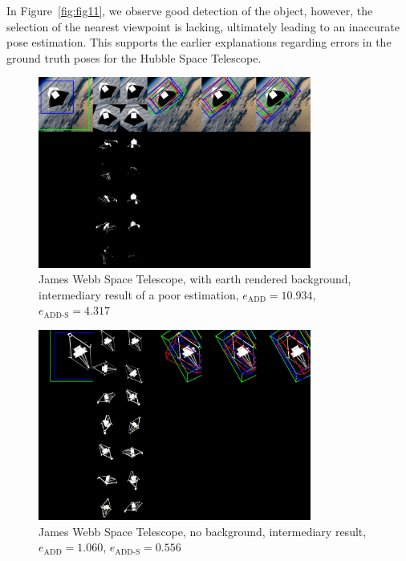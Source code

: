 \bigskip

In Figure~\ref{fig:fig11}, we observe good detection of the object, however, the selection of the nearest viewpoint is lacking, ultimately leading to an inaccurate pose estimation. This supports the earlier explanations regarding errors in the ground truth poses for the Hubble Space Telescope. 

\bigskip
\cleardoublepage{}

\begin{figure}[ht]
  \centering
  \includegraphics[width=0.8\textwidth]{data/fig12.jpg}
  \caption{James Webb Space Telescope, with earth rendered background, intermediary result of a poor estimation, $e_\mathrm{ADD}=10.934$, $e_{\mathrm{ADD}\text{-}\mathrm{S}}=4.317$}
  \label{fig:fig12}
\end{figure}

\bigskip

\begin{figure}[ht]
  \centering
  \includegraphics[width=0.8\textwidth]{data/fig16.jpg}
  \caption{James Webb Space Telescope, no background, intermediary result, $e_\mathrm{ADD}=1.060$, $e_{\mathrm{ADD}\text{-}\mathrm{S}}=0.556$}
  \label{fig:fig16}
\end{figure}

